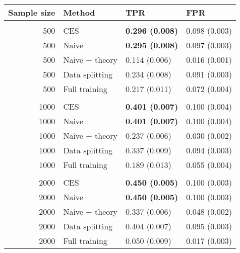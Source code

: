 
\begin{tabular}[t]{rlll}
\toprule
Sample size & Method & TPR & FPR\\
\midrule
\addlinespace[0.3em]
\multicolumn{4}{l}{\textbf{500}}\\
\hspace{1em}500 & CES & \textbf{0.296 (0.008)} & 0.098 (0.003)\\
\hspace{1em}500 & Naive & \textbf{0.295 (0.008)} & 0.097 (0.003)\\
\hspace{1em}500 & Naive + theory & 0.114 (0.006) & 0.016 (0.001)\\
\hspace{1em}500 & Data splitting & 0.234 (0.008) & 0.091 (0.003)\\
\hspace{1em}500 & Full training & 0.217 (0.011) & 0.072 (0.004)\\
\addlinespace[0.3em]
\multicolumn{4}{l}{\textbf{1000}}\\
\hspace{1em}1000 & CES & \textbf{0.401 (0.007)} & 0.100 (0.004)\\
\hspace{1em}1000 & Naive & \textbf{0.401 (0.007)} & 0.100 (0.004)\\
\hspace{1em}1000 & Naive + theory & 0.237 (0.006) & 0.030 (0.002)\\
\hspace{1em}1000 & Data splitting & 0.337 (0.009) & 0.094 (0.003)\\
\hspace{1em}1000 & Full training & 0.189 (0.013) & 0.055 (0.004)\\
\addlinespace[0.3em]
\multicolumn{4}{l}{\textbf{2000}}\\
\hspace{1em}2000 & CES & \textbf{0.450 (0.005)} & 0.100 (0.003)\\
\hspace{1em}2000 & Naive & \textbf{0.450 (0.005)} & 0.100 (0.003)\\
\hspace{1em}2000 & Naive + theory & 0.337 (0.006) & 0.048 (0.002)\\
\hspace{1em}2000 & Data splitting & 0.404 (0.007) & 0.095 (0.003)\\
\hspace{1em}2000 & Full training & 0.050 (0.009) & 0.017 (0.003)\\
\bottomrule
\end{tabular}
